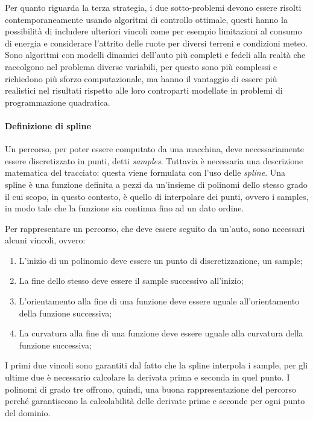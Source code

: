 Per quanto riguarda la terza strategia, i due sotto-problemi devono essere risolti contemporaneamente
usando algoritmi di controllo ottimale, questi hanno la possibilità di includere ulteriori vincoli come
per esempio limitazioni al consumo di energia e considerare l'attrito delle ruote per diversi terreni e
condizioni meteo.\cite{christ2021time} Sono algoritmi con modelli dinamici dell'auto più completi e
fedeli alla realtà che raccolgono nel problema diverse variabili, per questo sono più complessi e
richiedono più sforzo computazionale, ma hanno il vantaggio di essere più realistici nel risultati
rispetto alle loro controparti modellate in problemi di programmazione quadratica.

\paragraph{Definizione di spline \cite{olausson2021optimal} \cite{globalplanning-lec}}
\label{par:spline-def}
Un percorso, per poter essere computato da una macchina, deve necessariamente essere discretizzato in
punti, detti \textit{samples}.
Tuttavia è necessaria una descrizione matematica del tracciato: questa viene formulata con l'uso delle
\textit{spline}. Una spline è una funzione definita a pezzi da un'insieme di polinomi dello stesso grado
il cui scopo, in questo contesto, è quello di interpolare dei punti, ovvero i samples, in modo tale che
la funzione sia continua fino ad un dato ordine.

Per rappresentare un percorso, che deve essere seguito da un'auto, sono necessari alcuni vincoli, ovvero:
\begin{enumerate}
	\item L'inizio di un polinomio deve essere un punto di discretizzazione, un sample;
	\item La fine dello stesso deve essere il sample successivo all'inizio;
	\item L'orientamento alla fine di una funzione deve essere uguale all'orientamento della funzione
	      successiva;
	\item La curvatura alla fine di una funzione deve essere uguale alla curvatura della funzione
	      successiva;
\end{enumerate}
I primi due vincoli sono garantiti dal fatto che la spline interpola i sample, per gli ultime due è
necessario calcolare la derivata prima e seconda in quel punto. I polinomi di grado tre offrono, quindi,
una buona rappresentazione del percorso perché garantiscono la calcolabilità delle derivate prime e
seconde per ogni punto del dominio.


